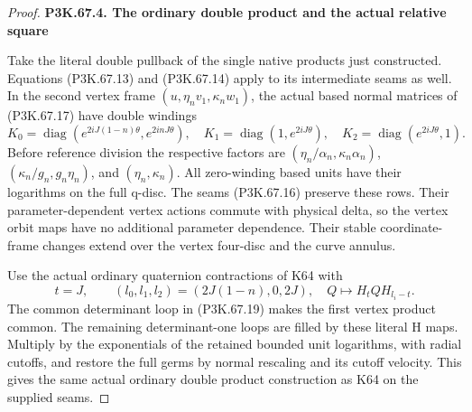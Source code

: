 \begin{proof}
\par

\medskip\noindent\textbf{P3K.67.4. The ordinary double product and the actual relative square}

\par\nobreak

Take the literal double pullback of the single native products just
constructed. Equations (P3K.67.13) and (P3K.67.14) apply to its intermediate
seams as well. In the second vertex frame \((u,\eta_nv_1,\kappa_nw_1)\),
the actual based normal matrices of (P3K.67.17) have double windings
\[
 K_0=\operatorname{diag}(e^{2iJ(1-n)\theta},e^{2inJ\theta}),\quad
 K_1=\operatorname{diag}(1,e^{2iJ\theta}),\quad
 K_2=\operatorname{diag}(e^{2iJ\theta},1).
 \tag{P3K.67.19}
\]
Before reference division the respective factors are
\((\eta_n/\alpha_n,\kappa_n\alpha_n)\),
\((\kappa_n/g_n,g_n\eta_n)\), and \((\eta_n,\kappa_n)\).
All zero-winding based units have their logarithms on the full q-disc.
The seams (P3K.67.16) preserve these rows. Their parameter-dependent vertex
actions commute with physical delta, so the vertex orbit maps have
no additional parameter dependence. Their stable coordinate-frame
changes extend over the vertex four-disc and the curve annulus.

Use the actual ordinary quaternion contractions of K64 with
\[
 t=J,\qquad(l_0,l_1,l_2)=(2J(1-n),0,2J),\quad
 Q\mapsto H_tQH_{l_i-t}.
 \tag{P3K.67.20}
\]
The common determinant loop in (P3K.67.19) makes the first vertex product
common. The remaining determinant-one loops are filled by these
literal H maps. Multiply by the exponentials of the retained bounded
unit logarithms, with radial cutoffs, and restore the full germs by
normal rescaling and its cutoff velocity. This gives the same actual
ordinary double product construction as K64 on the supplied seams.


\end{proof}
